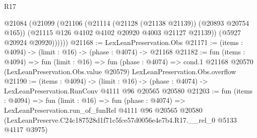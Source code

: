 \begin{lexlean}{R17}
\begin{coremodule}
          @21084
            (@21099
              (@21106
                (@21114 (@21128 (@21138 @21139)) (@20893 @20754 @165))
                (@21115 @126 @4102 @4102 @20920 @4003 @21127 @21139))
              (@5927 @20924 @20920))))))
@21168 := LexLeanPreservation.Obs
@21171 := (items : @4094) -> (limit : @16) -> (phase : @4074) -> @21168
@21182 := fun (items : @4094) =>
  fun (limit : @16) =>
  fun (phase : @4074) =>
  cond.{1} @21168 @20570 (LexLeanPreservation.Obs.value @20579) LexLeanPreservation.Obs.overflow
@21190 := (items : @4094) ->
  (limit : @16) -> (phase : @4074) -> LexLeanPreservation.RunConv @4111 @96 @20565 @20580
@21203 := fun (items : @4094) =>
  fun (limit : @16) =>
  fun (phase : @4074) =>
  LexLeanPreservation.run_of_funRel
    @4111
    @96
    @20565
    @20580
    (LexLeanPreserve.C24c187528d1f71c5fce57d0056e4e7b4.R17.__rel_0 @5133 @4117 @3975)
\end{coremodule}
\end{lexlean}
